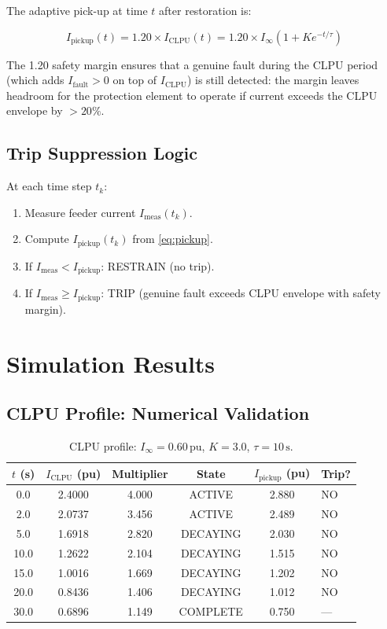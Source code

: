\documentclass[11pt, a4paper]{article}
\newcommand{\pu}{\,\text{pu}}
\begin{document}
The adaptive pick-up at time $t$ after restoration is:

\begin{equation}
  I_{\mathrm{pickup}}(t) = 1.20 \times I_{\mathrm{CLPU}}(t)
    = 1.20 \times I_\infty \left(1 + K e^{-t/\tau}\right)
  \label{eq:pickup}
\end{equation}

The 1.20 safety margin ensures that a genuine fault during the CLPU period
(which adds $I_{\mathrm{fault}} > 0$ on top of $I_{\mathrm{CLPU}}$) is
still detected: the margin leaves headroom for the protection element to
operate if current exceeds the CLPU envelope by $> 20\%$.

\subsection{Trip Suppression Logic}

At each time step $t_k$:
\begin{enumerate}
  \item Measure feeder current $I_{\mathrm{meas}}(t_k)$.
  \item Compute $I_{\mathrm{pickup}}(t_k)$ from \eqref{eq:pickup}.
  \item If $I_{\mathrm{meas}} < I_{\mathrm{pickup}}$: RESTRAIN (no trip).
  \item If $I_{\mathrm{meas}} \geq I_{\mathrm{pickup}}$: TRIP (genuine fault
    exceeds CLPU envelope with safety margin).
\end{enumerate}

\section{Simulation Results}
\label{sec:results}

\subsection{CLPU Profile: Numerical Validation}

\begin{table}[ht]
\centering
\caption{CLPU profile: $I_\infty = 0.60\pu$, $K = 3.0$, $\tau = 10\,\text{s}$.}
\label{tab:clpu_profile}
\begin{tabular}{cccccl}
\toprule
$t$ (s) & $I_{\mathrm{CLPU}}$ (pu) & Multiplier & State & $I_{\mathrm{pickup}}$ (pu) & Trip? \\
\midrule
0.0  & 2.4000 & 4.000 & ACTIVE   & 2.880 & NO \\
2.0  & 2.0737 & 3.456 & ACTIVE   & 2.489 & NO \\
5.0  & 1.6918 & 2.820 & DECAYING & 2.030 & NO \\
10.0 & 1.2622 & 2.104 & DECAYING & 1.515 & NO \\
15.0 & 1.0016 & 1.669 & DECAYING & 1.202 & NO \\
20.0 & 0.8436 & 1.406 & DECAYING & 1.012 & NO \\
30.0 & 0.6896 & 1.149 & COMPLETE & 0.750 & --- \\
\bottomrule
\end{tabular}
\end{table}
\end{document}
